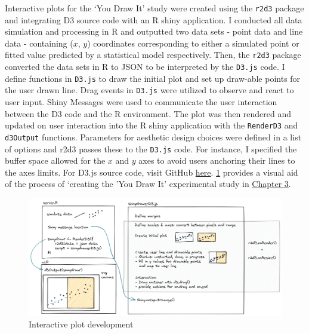 \documentclass[print]{nuthesis}
\begin{document}
Interactive plots for the `You Draw It' study were created using the \texttt{r2d3} package and integrating D3 source code with an R shiny application.
I conducted all data simulation and processing in R and outputted two data sets - point data and line data - containing (\(x\), \(y\)) coordinates corresponding to either a simulated point or fitted value predicted by a statistical model respectively.
Then, the \texttt{r2d3} package converted the data sets in R to JSON to be interpreted by the \texttt{D3.js} code.
I define functions in \texttt{D3.js} to draw the initial plot and set up draw-able points for the user drawn line.
Drag events in \texttt{D3.js} were utilized to observe and react to user input.
Shiny Messages were used to communicate the user interaction between the D3 code and the R environment.
The plot was then rendered and updated on user interaction into the R shiny application with the \texttt{RenderD3} and \texttt{d3Output} functions.
Parameters for aesthetic design choices were defined in a list of options and r2d3 passes these to the \texttt{D3.js} code.
For instance, I specified the buffer space allowed for the \(x\) and \(y\) axes to avoid users anchoring their lines to the axes limits. For D3.js source code, visit GitHub \href{https://github.com/srvanderplas/Perception-of-Log-Scales/blob/master/you-draw-it-development/you-draw-it-test-app/main.js}{here}.
\cref{fig:r2d3-shiny-flowchart} provides a visual aid of the process of `creating the 'You Draw It' experimental study in \protect\hyperlink{youdrawit}{Chapter 3}.

\begin{figure}[tbp]

{\centering \includegraphics[width=1\linewidth,]{images/02-you-draw-it/r2d3+shiny} 

}

\caption{Interactive plot development}\label{fig:r2d3-shiny-flowchart}
\end{figure}
\end{document}

